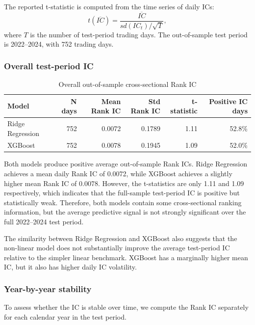 \documentclass[12pt]{article}
\begin{document}
The reported t-statistic is computed from the time series of daily ICs:
\[
t(\overline{IC})
=
\frac{\overline{IC}}
{sd(IC_t)/\sqrt{T}},
\]
where \(T\) is the number of test-period trading days. The out-of-sample test period is 2022--2024, with 752 trading days.

\subsubsection{Overall test-period IC}

\begin{table}[htbp]
\centering
\small
\caption{Overall out-of-sample cross-sectional Rank IC}
\label{tab:overall_ic}
\begin{tabular}{lrrrrr}
\toprule
Model & N days & Mean Rank IC & Std Rank IC & t-statistic & Positive IC days \\
\midrule
Ridge Regression & 752 & 0.0072 & 0.1789 & 1.11 & 52.8\% \\
XGBoost & 752 & 0.0078 & 0.1945 & 1.09 & 52.0\% \\
\bottomrule
\end{tabular}
\end{table}

Both models produce positive average out-of-sample Rank ICs. Ridge Regression achieves a mean daily Rank IC of 0.0072, while XGBoost achieves a slightly higher mean Rank IC of 0.0078. However, the t-statistics are only 1.11 and 1.09 respectively, which indicates that the full-sample test-period IC is positive but statistically weak. Therefore, both models contain some cross-sectional ranking information, but the average predictive signal is not strongly significant over the full 2022--2024 test period.

The similarity between Ridge Regression and XGBoost also suggests that the non-linear model does not substantially improve the average test-period IC relative to the simpler linear benchmark. XGBoost has a marginally higher mean IC, but it also has higher daily IC volatility.

\subsubsection{Year-by-year stability}

To assess whether the IC is stable over time, we compute the Rank IC separately for each calendar year in the test period.
\end{document}
